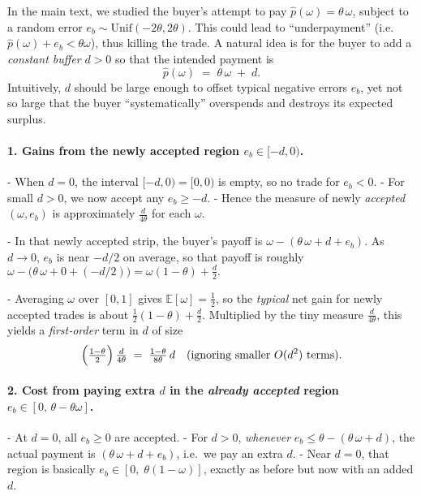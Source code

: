 \documentclass{article}
\begin{document}
In the main text, we studied the buyer’s attempt to pay 
\(\hat{p}(\omega)=\theta\,\omega\), subject to a random error \(e_b\sim\mathrm{Unif}(-2\theta,2\theta)\).
This could lead to “underpayment” (i.e.\ \(\hat{p}(\omega)+e_b < \theta\omega\)), 
thus killing the trade.  A natural idea is for the buyer to add a 
\emph{constant buffer} \(d>0\) so that the intended payment is
\[
\hat{p}(\omega) \;=\; \theta\,\omega \;+\; d.
\]
Intuitively, \(d\) should be large enough to offset typical negative errors 
\(e_b\), yet not so large that the buyer “systematically” overspends and 
destroys its expected surplus.  

\paragraph{1. Gains from the newly accepted region $e_b\in[-d,0)$.}
- When $d=0$, the interval $[-d,0)=[0,0)$ is empty, so no trade for $e_b<0$.  
- For small $d>0$, we now accept any $e_b\ge -d$.  
- Hence the measure of newly \emph{accepted} $(\omega,e_b)$ is approximately 
  \(\tfrac{d}{4\theta}\) for each $\omega$.  

- In that newly accepted strip, the buyer’s payoff is 
  \(\omega - (\theta\,\omega + d + e_b)\).  
  As $d\to0$, $e_b$ is near $-d/2$ on average, so that payoff is roughly 
  \(\omega - \bigl(\theta\,\omega + 0 + (-d/2)\bigr) 
  = \omega(1-\theta) + \tfrac{d}{2}.\)

- Averaging $\omega$ over $[0,1]$ gives $\mathbb{E}[\omega]=\tfrac12$, 
  so the \emph{typical} net gain for newly accepted trades is about 
  \(\tfrac12(1-\theta) + \tfrac{d}{2}\).  
  Multiplied by the tiny measure $\tfrac{d}{4\theta}$, this yields a 
  \textit{first‐order} term in $d$ of size 
  \[
     \Bigl(\tfrac{1-\theta}{2}\Bigr)\,\tfrac{d}{4\theta}
     \;=\;
     \tfrac{1-\theta}{8\theta}\,d
     \quad (\text{ignoring smaller }O(d^2)\text{ terms}).
  \]

\paragraph{2. Cost from paying extra $d$ in the \emph{already accepted} region $e_b\in[0,\,\theta-\theta\omega]$.}
- At $d=0$, all $e_b\ge0$ are accepted.  
- For $d>0$, \emph{whenever} $e_b \le \theta - (\theta\,\omega + d)$, 
  the actual payment is $(\theta\,\omega + d + e_b)$, i.e.\ we pay an extra $d$.  
- Near $d=0$, that region is basically $e_b \in [0,\;\theta(1-\omega)]$, exactly as before but now with an added $d$.  
\end{document}
